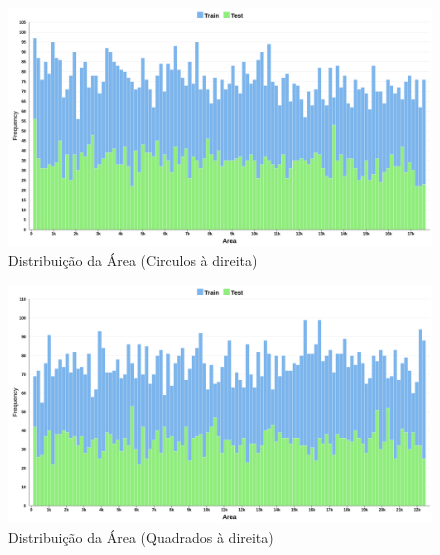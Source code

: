     \begin{figure}[H]
        \centering
        \includegraphics[width=1.0\linewidth]{imgs/Test_7/7_2/dataset/car_ci_distribution_hist.png}
        \caption{Distribuição da Área (Circulos à direita)}
        \label{fig:enter-label}
    \end{figure}
    \begin{figure}[H]
        \centering
        \includegraphics[width=1.0\linewidth]{imgs/Test_7/7_2/dataset/sar_sq_distribution_hist.png}
        \caption{Distribuição da Área (Quadrados à direita)}
        \label{fig:enter-label}
    \end{figure}
